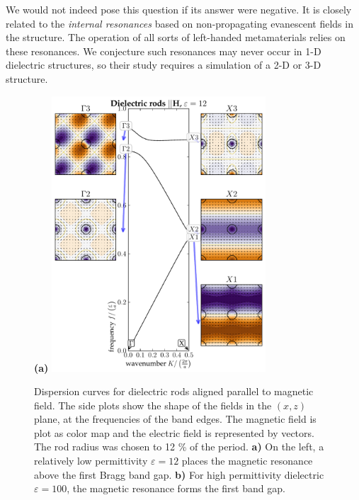 \documentclass[letterpaper,12pt]{report}
\begin{document}
We would not indeed pose this question if its answer were negative. It is closely related to the \textit{internal resonances} based on non-propagating evanescent fields in the structure. The operation of all sorts of left-handed metamaterials  relies on these resonances. We conjecture such resonances may never occur in 1-D dielectric structures, so their study requires a simulation of a 2-D or 3-D structure.
\begin{figure}[ht] \caption{Dispersion curves for dielectric rods aligned parallel to magnetic field. The side plots show the shape of the fields in the $(x,z)$ plane, at the frequencies of the band edges. The magnetic field is plot as color map and the electric field is represented by vectors. The rod radius was chosen to 12 \% of the period. \textbf{a)} On the left, a relatively low permittivity $\varepsilon = 12$ places the magnetic resonance above the first Bragg band gap. \textbf{b)} For high permittivity dielectric $\varepsilon = 100$, the magnetic resonance forms the first band gap. } \label{fg_rodh} \centering 
\textbf{(a)}	\includegraphics[width=8cm]{img/HRods_eps012_R12_PWEM.pdf}

\end{figure}
\end{document}
